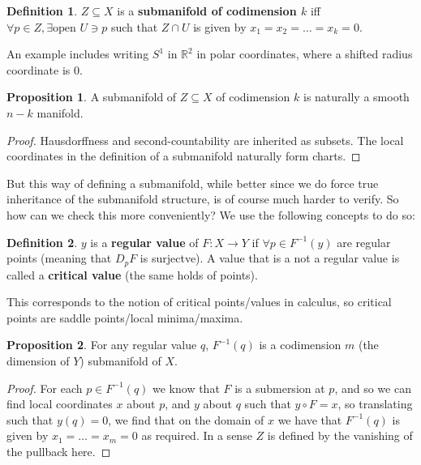 \documentclass{article}
\theoremstyle{definition}
\newtheorem{definition}{Definition}
\newtheorem{proposition}{Proposition}
\begin{document}
\begin{definition}
$Z \subseteq X$ is a \textbf{submanifold of codimension $k$} iff $\forall p \in Z,
\exists \text{open } U \ni p$ such that $Z \cap U$ is given by $x_1 = x_2 =
\dots = x_k = 0$.
\end{definition}

An example includes writing $S^1$ in $\mathbb{R}^2$ in polar coordinates, where
a shifted radius coordinate is 0.

\begin{proposition}
A submanifold of $Z \subseteq X$ of codimension $k$ is naturally a smooth $n -
k$ manifold. 
\end{proposition}

\begin{proof}
Hausdorffness and second-countability are inherited as subsets. The local
coordinates in the definition of a submanifold naturally form charts.
\end{proof}

But this way of defining a submanifold, while better since we do force true
inheritance of the submanifold structure, is of course much harder to verify. So
how can we check this more conveniently? We use the following concepts to do so:

\begin{definition}
  $y$ is a \textbf{regular value} of $F : X \to Y$ if $\forall p \in F^{-1}(y)$ are
  regular points (meaning that $D_pF$ is surjectve). A value that is a not a
  regular value is called a \textbf{critical value} (the same holds of points).
\end{definition}

This corresponds to the notion of critical points/values in calculus, so
critical points are saddle points/local minima/maxima.

\begin{proposition}
  For any regular value $q$, $F^{-1}(q)$ is a codimension $m$ (the dimension of
  $Y$) submanifold of $X$.
\end{proposition}

\begin{proof}
  For each $p \in F^{-1}(q)$ we know that $F$ is a submersion at $p$, and so we
  can find local coordinates $x$ about $p$, and $y$ about $q$ such that $y \circ
  F = x$, so translating such that $y(q) = 0$, we find that on the domain of $x$
  we have that $F^{-1}(q)$ is given by $x_1 = \dots = x_m = 0$ as required. In a
  sense $Z$ is defined by the vanishing of the pullback here.
\end{proof}
\end{document}
